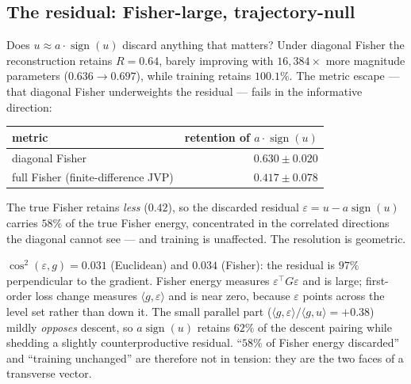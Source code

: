 \subsection{The residual: Fisher-large, trajectory-null}
\label{sec:residual}

Does $u\approx a\cdot\operatorname{sign}(u)$ discard anything that matters? Under
diagonal Fisher the reconstruction retains $R=0.64$, barely improving with
$16{,}384\times$ more magnitude parameters ($0.636\to0.697$), while training
retains $100.1\%$. The metric escape --- that diagonal Fisher underweights the
residual --- fails in the informative direction:

\begin{center}
\begin{tabular}{lr}
\toprule
metric & retention of $a\cdot\operatorname{sign}(u)$ \\
\midrule
diagonal Fisher & $0.630 \pm 0.020$ \\
full Fisher (finite-difference JVP) & $0.417 \pm 0.078$ \\
\bottomrule
\end{tabular}
\end{center}

The true Fisher retains \emph{less} ($0.42$), so the discarded residual
$\varepsilon=u-a\operatorname{sign}(u)$ carries $58\%$ of the true Fisher
energy, concentrated in the correlated directions the diagonal cannot see ---
and training is unaffected. The resolution is geometric.

\begin{proposition}
$\cos^2(\varepsilon,g)=0.031$ (Euclidean) and $0.034$ (Fisher): the residual is
$97\%$ perpendicular to the gradient. Fisher energy measures
$\varepsilon^\top G\varepsilon$ and is large; first-order loss change measures
$\langle g,\varepsilon\rangle$ and is near zero, because $\varepsilon$ points
across the level set rather than down it. The small parallel part
($\langle g,\varepsilon\rangle/\langle g,u\rangle=+0.38$) mildly \emph{opposes}
descent, so $a\operatorname{sign}(u)$ retains $62\%$ of the descent pairing while
shedding a slightly counterproductive residual. ``$58\%$ of Fisher energy
discarded'' and ``training unchanged'' are therefore not in tension: they are
the two faces of a transverse vector.
\end{proposition}

